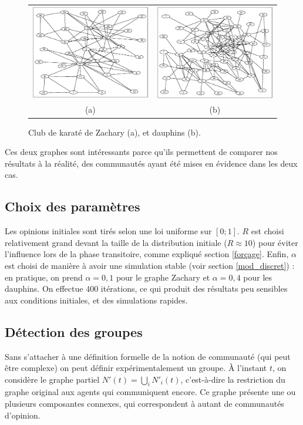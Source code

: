 \documentclass[12pt]{article}
\begin{document}
\begin{figure}[htb]
	\begin{center}
		\begin{tabular}[h]{cc}
			\includegraphics[width=.4\textwidth]{zachary} &
			\includegraphics[width=.4\textwidth]{dolphins}
			\vspace{-5mm}
			\\
			(a) & (b)
		\end{tabular}
	\end{center}
	\caption{Club de karaté de Zachary (a), et dauphins (b).}
	\label{exemples_graphes}
\end{figure}

Ces deux graphes sont intéressants parce qu'ils permettent de comparer
nos résultats à la réalité, des communautés ayant été mises en
évidence dans les deux cas.

\subsection{Choix des paramètres}
Les opinions initiales sont tirés selon une loi uniforme sur $[0; 1]$.
$R$ est choisi relativement grand devant la taille de la distribution
initiale ($R\approx10$) pour éviter l'influence lors de la phase
transitoire, comme expliqué section \ref{forçage}. Enfin, $\alpha$ est
choisi de manière à avoir une simulation stable (voir section
\ref{mod_discret}) : en pratique, on prend $\alpha = 0,1$ pour le
graphe Zachary et $\alpha = 0,4$ pour les dauphins. On effectue $400$
itérations, ce qui produit des résultats peu sensibles aux conditions
initiales, et des simulations rapides.

\subsection{Détection des groupes}
Sans s'attacher à une définition formelle de la notion de communauté
(qui peut être complexe) on peut définir expérimentalement un
groupe. À l'instant $t$, on considère le graphe partiel $N'(t) =
\bigcup_i N'_i(t)$, c'est-à-dire la restriction du graphe original aux
agents qui communiquent encore. Ce graphe présente une ou plusieurs
composantes connexes, qui correspondent à autant de communautés
d'opinion.
\end{document}
